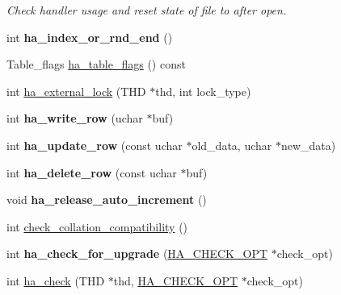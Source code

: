 \begin{DoxyCompactItemize}
\begin{DoxyCompactList}\small\item\em Check handler usage and reset state of file to after \textquotesingle{}open\textquotesingle{}. \end{DoxyCompactList}\item 
\mbox{\label{classhandler_a6e1ef9b6ab27156116f91bf50b1ac19f}} 
int {\bfseries ha\+\_\+index\+\_\+or\+\_\+rnd\+\_\+end} ()
\item 
Table\+\_\+flags \mbox{\hyperlink{classhandler_a6b3015577f49008561db1d34ae750e70}{ha\+\_\+table\+\_\+flags}} () const
\item 
int \mbox{\hyperlink{classhandler_a9a99b5f8ae28bc5c374919396f8dcf08}{ha\+\_\+external\+\_\+lock}} (T\+HD $\ast$thd, int lock\+\_\+type)
\item 
\mbox{\label{classhandler_ad8e651543ba0dbb2257a50dc1cdb5ea9}} 
int {\bfseries ha\+\_\+write\+\_\+row} (uchar $\ast$buf)
\item 
\mbox{\label{classhandler_a1f6bb19636dda0f1537fe780b6aca17a}} 
int {\bfseries ha\+\_\+update\+\_\+row} (const uchar $\ast$old\+\_\+data, uchar $\ast$new\+\_\+data)
\item 
\mbox{\label{classhandler_a3f0e3b24f5bb5b2a8fa0c45732db8cdd}} 
int {\bfseries ha\+\_\+delete\+\_\+row} (const uchar $\ast$buf)
\item 
\mbox{\label{classhandler_abfbcbef5b9b8ed0f76d700a29091ad3f}} 
void {\bfseries ha\+\_\+release\+\_\+auto\+\_\+increment} ()
\item 
int \mbox{\hyperlink{classhandler_a234580f9765751ce185182dd1edc3bdb}{check\+\_\+collation\+\_\+compatibility}} ()
\item 
\mbox{\label{classhandler_a79a8030a4a3928d216599e1c03e9b28c}} 
int {\bfseries ha\+\_\+check\+\_\+for\+\_\+upgrade} (\mbox{\hyperlink{structst__ha__check__opt}{H\+A\+\_\+\+C\+H\+E\+C\+K\+\_\+\+O\+PT}} $\ast$check\+\_\+opt)
\item 
int \mbox{\hyperlink{classhandler_a56545ec9967544c80d5612f8ac9b8e6e}{ha\+\_\+check}} (T\+HD $\ast$thd, \mbox{\hyperlink{structst__ha__check__opt}{H\+A\+\_\+\+C\+H\+E\+C\+K\+\_\+\+O\+PT}} $\ast$check\+\_\+opt)
\item 

\end{DoxyCompactItemize}
